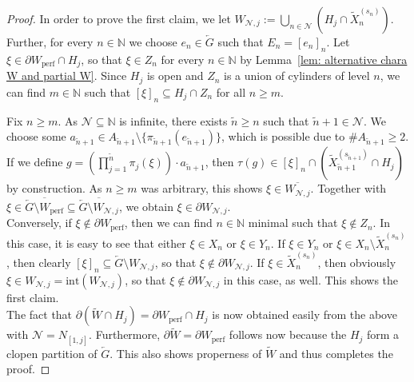 \documentclass[titlepage,reqno,10pt]{amsart}
\theoremstyle{definition}
\def\N{{\mathbb N}}
\newcommand{\tm}{\subseteq}
\newcommand{\kl}{\left(}
\newcommand{\kr}{\right)}
\newcommand{\ol}[1]{\overline{#1}}
\begin{document}
\begin{proof}
    In order to prove the first claim, we let $W_{\mathcal{N},j}:= \bigcup_{n\in \mathcal{N}}(H_j \cap \widetilde{X}_n^{(s_n)})$. Further, for every $n\in\N$ we choose $e_n\in\overleftarrow{G}$ such that $E_n = [e_n]_n$.
        Let $\xi \in \partial W_{\mathrm{perf}}\cap H_j$, so that $\xi\in Z_n$ for every $n\in\N$ by Lemma~\ref{lem: alternative chara W and partial W}.
    Since $H_j$ is open and $Z_n$ is a union of cylinders of level $n$, we can find $m\in\N$ such that $[\xi]_n\tm H_j\cap Z_n$ for all $n\geq m$. 
    
    Fix $n\geq m$. As $\mathcal{N}\tm \N$ is infinite, there exists $\widetilde{n}\geq n$ such that $\widetilde{n}+1 \in \mathcal{N}$.
    We choose some $a_{\widetilde{n}+1}\in A_{\widetilde{n}+1}\setminus\{\pi_{\widetilde{n}+1}(e_{\widetilde{n}+1})\}$, which is possible due to $\#A_{\widetilde{n}+1}\geq 2$.
    If we define $g = \kl\prod_{j=1}^{\widetilde{n}}\pi_j(\xi)\kr\cdot a_{\widetilde{n}+1}$, then $\tau(g) \in [\xi]_n\cap(\widetilde{X}_{\widetilde{n}+1}^{(s_{\widetilde{n}+1})}\cap H_j)$ by construction.
    As $n\geq m$ was arbitrary, this shows $\xi\in \ol{W_{\mathcal{N},j}}$.
    Together with $\xi\in \ol{\overleftarrow{G}\setminus W_{\mathrm{perf}}} \tm \ol{\overleftarrow{G}\setminus W_{\mathcal{N},j}}$, we obtain $\xi \in \partial W_{\mathcal{N},j}$.\\
    Conversely, if $\xi \notin \partial W_{\mathrm{perf}}$, then we can find $n\in\N$ minimal such that $\xi\notin Z_n$.
    In this case, it is easy to see that either $\xi\in X_n$ or $\xi \in Y_n$.
    If $\xi \in Y_n$ or $\xi \in X_n\setminus \widetilde{X}_n^{(s_n)}$, then clearly $[\xi]_n \tm \overleftarrow{G}\setminus W_{\mathcal{N},j}$, so that $\xi \notin \partial W_{\mathcal{N},j}$.
    If $\xi \in \widetilde{X}_n^{(s_n)}$, then obviously $\xi \in W_{\mathcal{N},j} = \mathrm{int}(W_{\mathcal{N},j})$, so that $\xi\notin \partial W_{\mathcal{N},j}$ in this case, as well.
    This shows the first claim.\\
    The fact that $\partial(\widetilde{W}\cap H_j) = \partial W_{\mathrm{perf}} \cap H_j$ is now obtained easily from the above with $\mathcal{N} = N_{[1,j]}$.
    Furthermore, $\partial\widetilde{W}=\partial W_{\mathrm{perf}}$ follows now because the $H_j$ form a clopen partition of $\overleftarrow{G}$.
    This also shows properness of $\widetilde{W}$ and thus completes the proof.
\end{proof}
\end{document}
